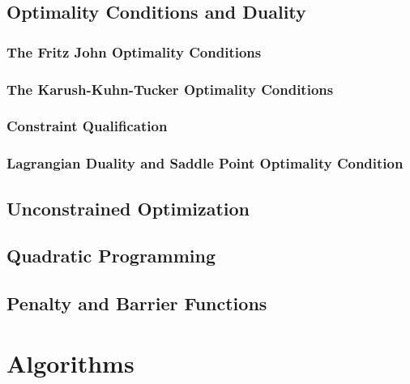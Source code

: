 		\chapter{Optimality Conditions and Duality}
			\section{The Fritz John Optimality Conditions}

			\section{The Karush-Kuhn-Tucker Optimality Conditions}

			\section{Constraint Qualification}

			\section{Lagrangian Duality and Saddle Point Optimality Condition}

		\chapter{Unconstrained Optimization}

		\chapter{Quadratic Programming}

		\chapter{Penalty and Barrier Functions}

	\part{Algorithms}\label{Algo}
